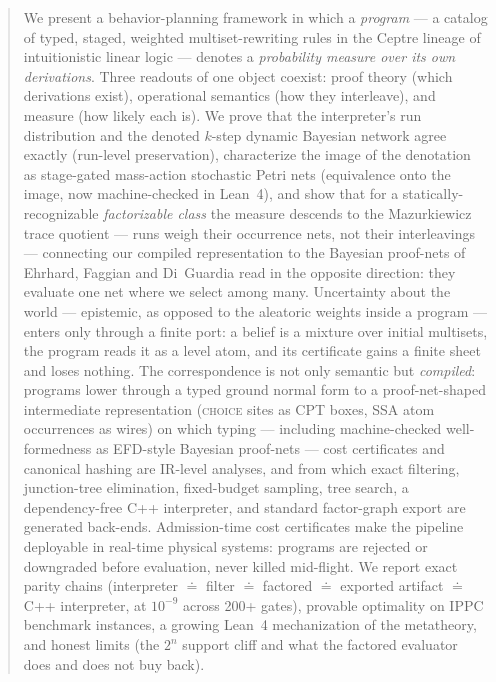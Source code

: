 \documentclass[11pt]{article}
\theoremstyle{plain}
\theoremstyle{definition}
\theoremstyle{remark}
\begin{document}
\begin{abstract}
We present a behavior-planning framework in which a \emph{program} --- a
catalog of typed, staged, weighted multiset-rewriting rules in the Ceptre
lineage of intuitionistic linear logic --- denotes a \emph{probability
measure over its own derivations}. Three readouts of one object coexist:
proof theory (which derivations exist), operational semantics (how they
interleave), and measure (how likely each is). We prove that the
interpreter's run distribution and the denoted $k$-step dynamic Bayesian
network agree exactly (run-level preservation), characterize the image of
the denotation as stage-gated mass-action stochastic Petri nets
(equivalence onto the image, now machine-checked in Lean~4), and show
that for a statically-recognizable \emph{factorizable class} the measure
descends to the Mazurkiewicz trace quotient --- runs weigh their
occurrence nets, not their interleavings --- connecting our compiled
representation to the Bayesian proof-nets of Ehrhard, Faggian and
Di~Guardia read in the opposite direction: they evaluate one net where we
select among many. Uncertainty about the world --- epistemic, as
opposed to the aleatoric weights inside a program --- enters only
through a finite port: a belief is a mixture over initial multisets, the
program reads it as a level atom, and its certificate gains a finite
sheet and loses nothing. The correspondence is not only semantic but
\emph{compiled}: programs lower through a typed ground normal form to a
proof-net-shaped intermediate representation (\textsc{choice} sites as
CPT boxes, SSA atom occurrences as wires) on which typing --- including
machine-checked well-formedness as EFD-style Bayesian proof-nets --- cost
certificates and canonical hashing are IR-level analyses, and from which
exact filtering, junction-tree elimination, fixed-budget sampling, tree
search, a dependency-free C++ interpreter, and standard factor-graph
export are generated back-ends. Admission-time cost certificates make the
pipeline deployable in real-time physical systems: programs are rejected
or downgraded before evaluation, never killed mid-flight. We report exact
parity chains (interpreter $\doteq$ filter $\doteq$ factored $\doteq$
exported artifact $\doteq$ C++ interpreter, at $10^{-9}$ across 200+
gates), provable optimality on IPPC benchmark instances, a growing Lean~4
mechanization of the metatheory, and honest limits (the $2^n$ support
cliff and what the factored evaluator does and does not buy back).
\end{abstract}
\end{document}
